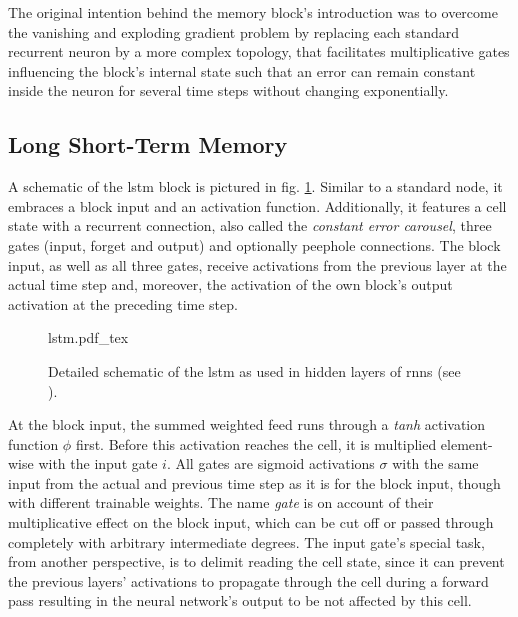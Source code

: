 The original intention behind the memory block's introduction was to overcome the vanishing and exploding gradient problem by replacing each standard recurrent neuron by a more complex topology, that facilitates multiplicative gates influencing the block's internal state such that an error can remain constant inside the neuron for several time steps without changing exponentially.

\subsection{Long Short-Term Memory}
A schematic of the \gls{lstm} block is pictured in fig. \ref{fig:lstm}.
Similar to a standard node, it embraces a block input and an activation function.
Additionally, it features  a cell state with a recurrent connection, also called the \textit{constant error carousel}, three gates (input, forget and output) and optionally peephole connections. The block input, as well as all three gates, receive activations from the previous layer at the actual time step and, moreover, the activation of the own block's output activation at the preceding time step.

\begin{figure}[!hbt]
	\footnotesize\centering
	\def\svgwidth{\columnwidth}
	{lstm.pdf_tex}
         \caption{Detailed schematic of the \gls{lstm} as used in hidden layers of \glspl{rnn} (see \cite{GreSri2015}).}
	\label{fig:lstm}
\end{figure}
At the block input, the summed weighted feed runs through a \textit{tanh} activation function $\phi$ first.
Before this activation reaches the cell, it is multiplied element-wise with the input gate $i$.
All gates are sigmoid activations $\sigma$ with the same input from the actual and previous time step as it is for the block input, though with different trainable weights.
The name \textit{gate} is on account of their multiplicative effect on the block input, which can be cut off or passed through completely with arbitrary intermediate degrees.
The input gate's special task, from another perspective, is to delimit reading the cell state, since it can prevent the previous layers' activations to propagate through the cell during a forward pass resulting in the neural network's output to be not affected by this cell.

